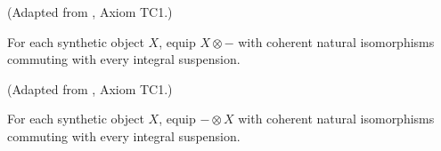 \begin{definition}
\label{frontier:Literature:320f401ce5e1}
(Adapted from \cite{May01}, Axiom TC1.)\par{}

For each synthetic object $X$, equip $X\otimes-$ with coherent natural isomorphisms commuting with every integral suspension.
\end{definition}

\begin{definition}
\label{frontier:Literature:4983add560f1}
(Adapted from \cite{May01}, Axiom TC1.)\par{}

For each synthetic object $X$, equip $-\otimes X$ with coherent natural isomorphisms commuting with every integral suspension.
\end{definition}

